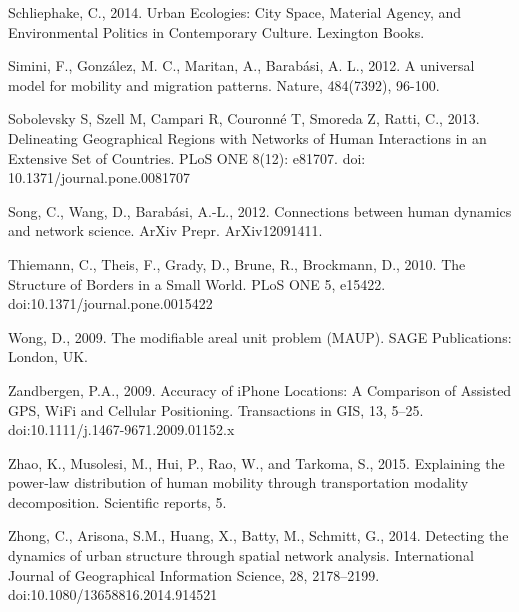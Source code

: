 \documentclass[]{tGIS2e}
\begin{document}
\begin{thebibliography}{9}
Schliephake, C., 2014. Urban Ecologies: City Space, Material Agency, and Environmental Politics in Contemporary Culture. Lexington Books.

Simini, F., González, M. C., Maritan, A., Barabási, A. L., 2012. A universal model for mobility and migration patterns. Nature, 484(7392), 96-100.

Sobolevsky S, Szell M, Campari R, Couronné T, Smoreda Z, Ratti, C., 2013. Delineating Geographical Regions with Networks of Human Interactions in an Extensive Set of Countries. PLoS ONE 8(12): e81707. doi: 10.1371/journal.pone.0081707


Song, C., Wang, D., Barabási, A.-L., 2012. Connections between human dynamics and network science. ArXiv Prepr. ArXiv12091411.


Thiemann, C., Theis, F., Grady, D., Brune, R., Brockmann, D., 2010. The Structure of Borders in a Small World. PLoS ONE 5, e15422. doi:10.1371/journal.pone.0015422



Wong, D., 2009. The modifiable areal unit problem (MAUP). SAGE Publications: London, UK.

Zandbergen, P.A., 2009. Accuracy of iPhone Locations: A Comparison of Assisted GPS, WiFi and Cellular Positioning. Transactions in GIS, 13, 5–25. doi:10.1111/j.1467-9671.2009.01152.x


Zhao, K., Musolesi, M., Hui, P., Rao, W., and Tarkoma, S., 2015. Explaining the power-law distribution of human mobility through transportation modality decomposition. Scientific reports, 5.

Zhong, C., Arisona, S.M., Huang, X., Batty, M., Schmitt, G., 2014. Detecting the dynamics of urban structure through spatial network analysis. International Journal of Geographical Information Science, 28, 2178–2199. doi:10.1080/13658816.2014.914521

\end{thebibliography}


%




\label{lastpage}
\end{document}
